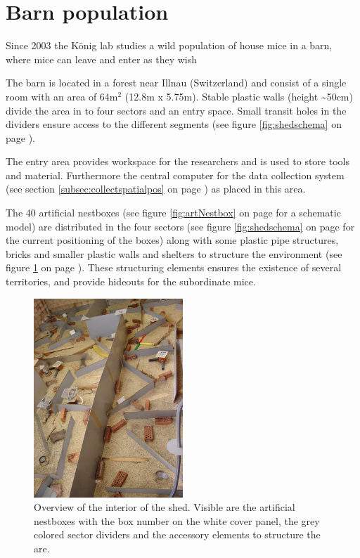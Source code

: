 \newpage
\section{Barn population}
\label{sec:shedsetup}

Since 2003 the K\"onig lab studies a wild population of house mice in a barn, where mice can leave and enter as they wish

The barn is located in a forest near Illnau (Switzerland) and consist of a single room with an area of 64m$^2$ (12.8m x 5.75m). Stable plastic walls (height \textasciitilde50cm) divide the area in to four sectors and an entry space. Small transit holes in the dividers ensure access to the different segments (see figure \ref{fig:shedschema} on page \pageref{fig:shedschema}).

The entry area provides workspace for the researchers and is used to store tools and material. Furthermore the central computer for the data collection system (see section \ref{subsec:collectspatialpos} on page \pageref{subsec:collectspatialpos}) as placed in this area.

The 40 artificial nestboxes (see figure \ref{fig:artNestbox} on page \pageref{fig:artNestbox} for a schematic model) are distributed in the four sectors (see figure \ref{fig:shedschema} on page \pageref{fig:shedschema} for the current positioning of the boxes) along with some plastic pipe structures, bricks and smaller plastic walls and shelters to structure the environment (see figure \ref{fig:shedoverview} on page \pageref{fig:shedoverview}). These structuring elements ensures the existence of several territories, and provide hideouts for the subordinate mice.

\begin{figure}[htpb]
\begin{center}
  \includegraphics[width=0.5\textwidth]{assets/pdf/shed_overview.pdf}
  \caption[Interior of the barn]{Overview of the interior of the shed. Visible are the artificial nestboxes with the box number on the white cover panel, the grey colored sector dividers and the accessory elements to structure the are.}
  \label{fig:shedoverview}
\end{center}
\end{figure}

